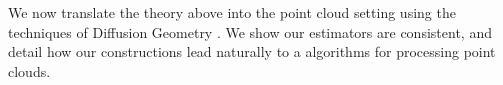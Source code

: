 \documentclass{article}
\let\todo\undefined
\let\todo\undefined
\newcommand{\todo}[1][]{}
\theoremstyle{remark}
\theoremstyle{plain}
\begin{document}
We now translate the theory above into the point cloud setting using the techniques of Diffusion Geometry \cite{jones2026manifolddiffusiongeometrycurvature, jonesComputingDiffusionGeometry2026}. We show our estimators are consistent, and detail how our constructions lead naturally to a algorithms for processing point clouds.


\end{document}
